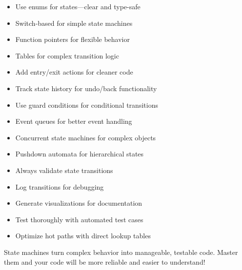 \begin{itemize}
    \item Use enums for states—clear and type-safe
    \item Switch-based for simple state machines
    \item Function pointers for flexible behavior
    \item Tables for complex transition logic
    \item Add entry/exit actions for cleaner code
    \item Track state history for undo/back functionality
    \item Use guard conditions for conditional transitions
    \item Event queues for better event handling
    \item Concurrent state machines for complex objects
    \item Pushdown automata for hierarchical states
    \item Always validate state transitions
    \item Log transitions for debugging
    \item Generate visualizations for documentation
    \item Test thoroughly with automated test cases
    \item Optimize hot paths with direct lookup tables
\end{itemize}

State machines turn complex behavior into manageable, testable code. Master them and your code will be more reliable and easier to understand!
